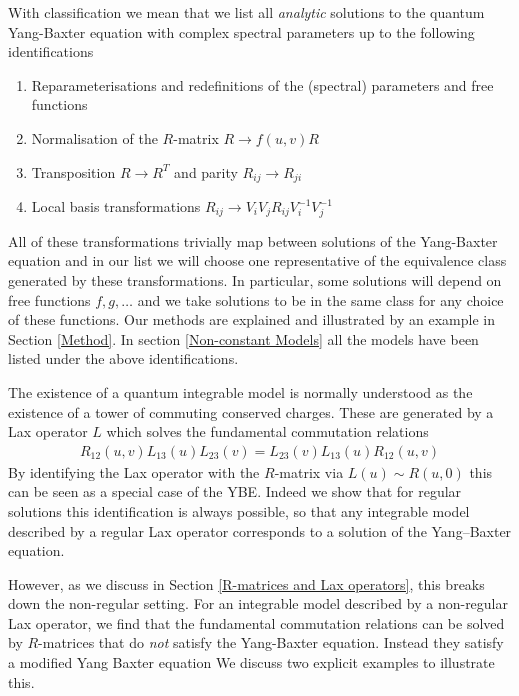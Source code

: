 \documentclass{article}
\begin{document}
With classification we mean that we list all \textit{analytic} solutions to the quantum Yang-Baxter equation with complex spectral parameters up to the following identifications 
%
\begin{enumerate}
\item Reparameterisations and redefinitions of the (spectral) parameters and free functions
\item Normalisation of the $R$-matrix $R\rightarrow f(u,v) R$
\item Transposition $R\rightarrow R^T$ and parity $R_{ij} \rightarrow R_{ji}$
\item Local basis transformations $R_{ij} \rightarrow V_{i} V_{j} R_{ij} V_{i}^{-1} V_{j}^{-1}$
\end{enumerate}
%
All of these transformations trivially map between solutions of the Yang-Baxter equation and in our list we will choose one representative of the equivalence class generated by these transformations. In particular, some solutions will depend on free functions $f,g,\ldots$ and we take solutions to be in the same class for any choice of these functions. Our methods are explained and illustrated by an example in Section \ref{Method}. In section \ref{Non-constant Models} all the models have been listed under the above identifications. 

The existence of a quantum integrable model is normally understood as the existence of a tower of commuting conserved charges. These are generated by a Lax operator $L$ which solves the fundamental commutation relations \cite{Faddeev:1987ih,Faddeev:1996iy} 
%
\begin{align}
R_{12}(u,v)L_{13}(u)L_{23}(v)=L_{23}(v)L_{13}(u)R_{12}(u,v)
\end{align}
%
By identifying the Lax operator with the $R$-matrix via $L(u)\sim R(u,0)$ this can be seen as a special case of the YBE. Indeed we show that for regular solutions this identification is always possible, so that any integrable model described by a regular Lax operator corresponds to a solution of the Yang--Baxter equation.

However, as we discuss in Section \ref{R-matrices and Lax operators}, this breaks down the non-regular setting. For an integrable model described by a non-regular Lax operator, we find that the fundamental commutation relations can be solved by $R$-matrices that do \textit{not} satisfy the Yang-Baxter equation. Instead they satisfy a modified Yang Baxter equation
%
%
We discuss two explicit examples to illustrate this.
\end{document}
